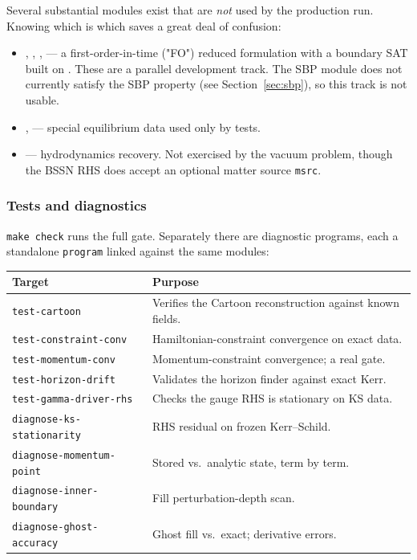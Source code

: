 Several substantial modules exist that are \emph{not} used by the production
run. Knowing which is which saves a great deal of confusion:

\begin{itemize}
\item {}, ,
      ,  --- a
      first-order-in-time ("FO") reduced formulation with a boundary SAT built
      on . These are a parallel development track. The SBP
      module does not currently satisfy the SBP property (see
      Section~\ref{sec:sbp}), so this track is not usable.
\item {},
       --- special equilibrium
      data used only by tests.
\item {} --- hydrodynamics recovery. Not
      exercised by the vacuum problem, though the BSSN RHS does accept an
      optional matter source \texttt{msrc}.
\end{itemize}

\subsubsection{Tests and diagnostics}

\texttt{make check} runs the full gate. Separately there are diagnostic
programs, each a standalone \texttt{program} linked against the same modules:

\begin{longtable}{@{}>{\raggedright\arraybackslash}p{4.50cm}>{\raggedright\arraybackslash}p{9.08cm}@{}}
\toprule
\textbf{Target} & \textbf{Purpose} \\
\midrule
\endhead
\texttt{test-cartoon} & Verifies the Cartoon reconstruction against known fields. \\
\texttt{test-constraint-conv} & Hamiltonian-constraint convergence on exact data. \\
\texttt{test-momentum-conv} & Momentum-constraint convergence; a real gate. \\
\texttt{test-horizon-drift} & Validates the horizon finder against exact Kerr. \\
\texttt{test-gamma-driver-rhs} & Checks the gauge RHS is stationary on KS data. \\
\texttt{diagnose-ks-stationarity} & RHS residual on frozen Kerr--Schild. \\
\texttt{diagnose-momentum-point} & Stored vs.\ analytic state, term by term. \\
\texttt{diagnose-inner-boundary} & Fill perturbation-depth scan. \\
\texttt{diagnose-ghost-accuracy} & Ghost fill vs.\ exact; derivative errors. \\
\bottomrule
\end{longtable}

